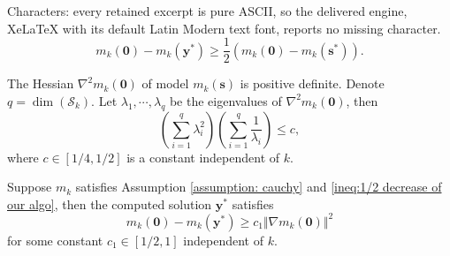 \documentclass[10pt,a4paper]{amsart}
\begin{document}
Characters: every retained excerpt is pure ASCII, so the delivered engine, XeLaTeX with its default Latin Modern text font, reports no missing character.
\begin{equation}\label{ineq:1/2 decrease of our algo}
    m_k(\bm 0)-m_k(\bm y^*)\geq \frac{1}{2}\left(m_k(\bm 0)-m_k(\bm s^*)\right).
\end{equation}

\begin{assumption}\label{assumption: cauchy}
    The Hessian $\nabla^2m_k(\bm 0)$ of model $m_k(\bm s)$
    is positive definite. Denote $q=\dim(\mathcal{S}_k)$.
    Let $\lambda_1,\cdots,\lambda_q$ be the eigenvalues of $\nabla^2m_k(\bm 0)$, then 
    \begin{equation*}  \left(\sum_{i=1}^q\lambda_i^2\right)\left(\sum_{i=1}^q\frac{1}{\lambda_i}\right)\leq c,
    \end{equation*}
    where $c\in[1/4,1/2]$ is a constant independent of $k$.
\end{assumption}

\begin{theorem}
Suppose $m_k$ satisfies Assumption \ref{assumption: cauchy} and \eqref{ineq:1/2 decrease of our algo}, then the computed solution $\bm y^*$ satisfies
\begin{equation}\label{ineq:pre_cauchy decrease}
    m_k(\bm 0)-m_k(\bm y^*)\geq c_1\Vert\nabla m_k(\bm 0)\Vert^2
\end{equation}
for some constant $c_1\in[1/2,1]$ independent of $k$.
\end{theorem}
\end{document}
